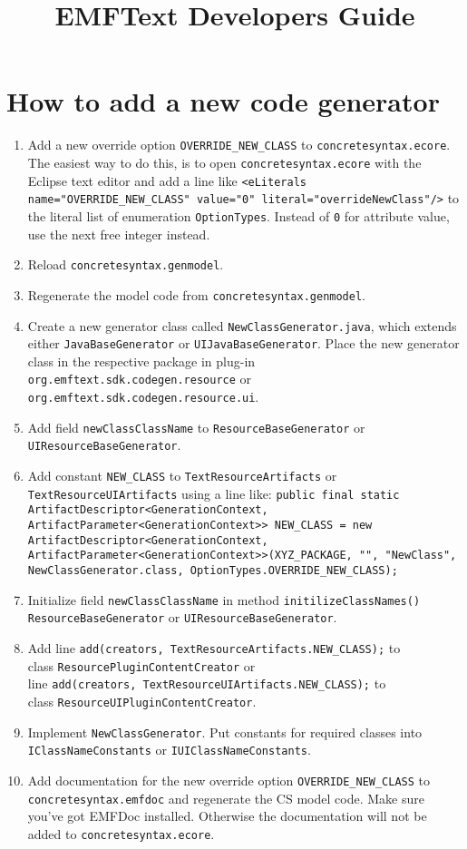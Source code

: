 \documentclass{scrartcl}
\title{EMFText Developers Guide}
\begin{document}
\section{How to add a new code generator}

\begin{enumerate}
	\item Add a new override option \texttt{OVERRIDE\_NEW\_CLASS} to 
		  \texttt{concretesyntax.ecore}. The easiest way to do this, is to open
		  \texttt{concretesyntax.ecore} with the Eclipse text editor and add a
		  line like \texttt{<eLiterals name="OVERRIDE\_NEW\_CLASS" value="0"
		  literal="overrideNewClass"/>} to the literal list of enumeration
		  \texttt{OptionTypes}. Instead of \texttt{0} for attribute value, use
		  the next free integer instead.
	\item Reload \texttt{concretesyntax.genmodel}.
	\item Regenerate the model code from \texttt{concretesyntax.genmodel}.
	\item Create a new generator class called \texttt{NewClassGenerator.java},
		  which extends either \texttt{JavaBaseGenerator} or
		  \texttt{UIJavaBaseGenerator}. Place the new generator class in the
		  respective package in plug-in 
		  \texttt{org.emftext.sdk.codegen.resource} or
		  \texttt{org.emftext.sdk.codegen.resource.ui}.
	\item Add field \texttt{newClassClassName} to \texttt{ResourceBaseGenerator}
		  or \texttt{UIResourceBaseGenerator}.
	\item Add constant \texttt{NEW\_CLASS} to \texttt{TextResourceArtifacts} or
		  \texttt{TextResourceUIArtifacts} using a line like:
		  \texttt{public final static ArtifactDescriptor<GenerationContext,
	ArtifactParameter<GenerationContext>> NEW\_CLASS = new
	ArtifactDescriptor<GenerationContext,
	ArtifactParameter<GenerationContext>>(XYZ\_PACKAGE, "", "NewClass",
	NewClassGenerator.class, OptionTypes.OVERRIDE\_NEW\_CLASS);}
	
	\item Initialize field \texttt{newClassClassName} in method
		  \texttt{initilizeClassNames()} \texttt{ResourceBaseGenerator} or
		  \texttt{UIResourceBaseGenerator}.
		  
	\item Add line \texttt{add(creators, TextResourceArtifacts.NEW\_CLASS);} to\\
		  class \texttt{ResourcePluginContentCreator} or \\
		  line \texttt{add(creators, TextResourceUIArtifacts.NEW\_CLASS);} to\\ 
		  class \texttt{ResourceUIPluginContentCreator}.
		  
	\item Implement \texttt{NewClassGenerator}. Put constants for required
		  classes into \texttt{IClassNameConstants} or 
		  \texttt{IUIClassNameConstants}.
		  
	\item Add documentation for the new override option
		  \texttt{OVERRIDE\_NEW\_CLASS} to \texttt{concretesyntax.emfdoc} and
		  regenerate the CS model code. Make sure you've got EMFDoc installed.
		  Otherwise the documentation will not be added to
		  \texttt{concretesyntax.ecore}.
\end{enumerate}
\end{document}
